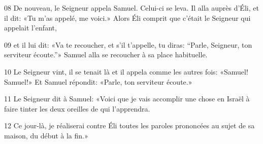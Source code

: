
08 De nouveau, le Seigneur appela Samuel. Celui-ci se leva. Il alla auprès d’Éli, et il dit: «Tu m’as appelé, me voici.» Alors Éli comprit que c’était le Seigneur qui appelait l’enfant,

09 et il lui dit: «Va te recoucher, et s’il t’appelle, tu diras: “Parle, Seigneur, ton serviteur écoute.”» Samuel alla se recoucher à sa place habituelle.

10 Le Seigneur vint, il se tenait là et il appela comme les autres fois: «Samuel! Samuel!» Et Samuel répondit: «Parle, ton serviteur écoute.»

11 Le Seigneur dit à Samuel: «Voici que je vais accomplir une chose en Israël à faire tinter les deux oreilles de qui l’apprendra.

12 Ce jour-là, je réaliserai contre Éli toutes les paroles prononcées au sujet de sa maison, du début à la fin.»
